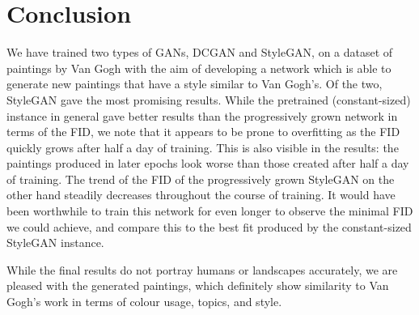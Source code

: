 \documentclass{article}
\begin{document}
\section{Conclusion}

We have trained two types of GANs, DCGAN and StyleGAN, on a dataset of paintings by Van Gogh with the aim of developing a network which is able to generate new paintings that have a style similar to Van Gogh's. Of the two, StyleGAN gave the most promising results. While the pretrained (constant-sized) instance in general gave better results than the progressively grown network in terms of the FID, we note that it appears to be prone to overfitting as the FID quickly grows after half a day of training. This is also visible in the results: the paintings produced in later epochs look worse than those created after half a day of training. The trend of the FID of the progressively grown StyleGAN on the other hand steadily decreases throughout the course of training. It would have been worthwhile to train this network for even longer to observe the minimal FID we could achieve, and compare this to the best fit produced by the constant-sized StyleGAN instance.

While the final results do not portray humans or landscapes accurately, we are pleased with the generated paintings, which definitely show similarity to Van Gogh's work in terms of colour usage, topics, and style.




\newpage


\end{document}
